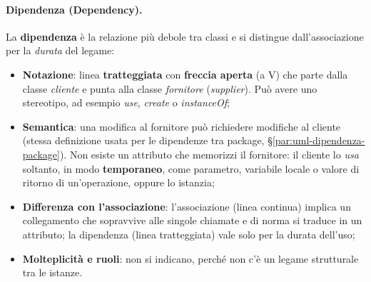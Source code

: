 \documentclass[12pt]{extarticle}
\newcommand{\cn}[1]{\makebox[\linewidth][c]{\textbf{#1}}}
\begin{document}
\begin{figure}[htbp]
    \centering
{}
    \label{fig:navigability_arrow}
\end{figure}

\paragraph{Dipendenza (Dependency).}\label{par:uml-dipendenza}
La \textbf{dipendenza} è la relazione più debole tra classi e si distingue dall'associazione per la \emph{durata} del legame:
\begin{itemize}
    \item \textbf{Notazione}: linea \textbf{tratteggiata} con \textbf{freccia aperta} (a V) che parte dalla classe \emph{cliente} e punta alla classe \emph{fornitore} (\textit{supplier}). Può avere uno stereotipo, ad esempio \guillemotleft\textit{use}\guillemotright{}, \guillemotleft\textit{create}\guillemotright{} o \guillemotleft\textit{instanceOf}\guillemotright{};
    \item \textbf{Semantica}: una modifica al fornitore può richiedere modifiche al cliente (stessa definizione usata per le dipendenze tra package, \S\ref{par:uml-dipendenza-package}). Non esiste un attributo che memorizzi il fornitore: il cliente lo \emph{usa} soltanto, in modo \textbf{temporaneo}, come parametro, variabile locale o valore di ritorno di un'operazione, oppure lo istanzia;
    \item \textbf{Differenza con l'associazione}: l'associazione (linea continua) implica un collegamento che sopravvive alle singole chiamate e di norma si traduce in un attributo; la dipendenza (linea tratteggiata) vale solo per la durata dell'uso;
    \item \textbf{Molteplicità e ruoli}: non si indicano, perché non c'è un legame strutturale tra le istanze.
\end{itemize}
\end{document}
